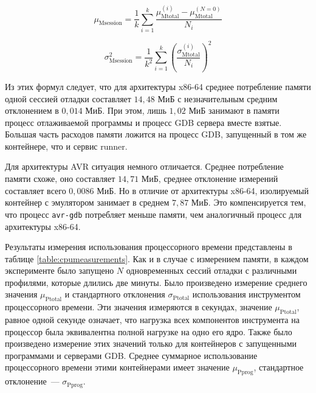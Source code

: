 \documentclass[a4paper,article,14pt]{extarticle}
\begin{document}
\begin{equation}
    \mu_\mathrm{Msession} = \frac1k \sum_{i=1}^k \frac{\mu_\mathrm{Mtotal}^{(i)} - \mu_\mathrm{Mtotal}^{(N = 0)}}{N_i}
    \label{eq:sessionmemorymean}
\end{equation}

\begin{equation}
    \sigma^2_\mathrm{Msession} = \frac{1}{k^2} \sum_{i=1}^k \left(\frac{\sigma_\mathrm{Mtotal}^{(i)}}{N_i}\right)^2
    \label{eq:sessionmemorystddev}
\end{equation}

Из этих формул следует, что для архитектуры x86-64 среднее потребление памяти одной сессией отладки составляет $14{,}48$ МиБ с незначительным средним отклонением в $0{,}014$ МиБ. При этом, лишь $1{,}02$ МиБ занимают в памяти процесс отлаживаемой программы и процесс GDB сервера вместе взятые. Большая часть расходов памяти ложится на процесс GDB, запущенный в том же контейнере, что и сервис runner.

Для архитектуры AVR ситуация немного отличается. Среднее потребление памяти схоже, оно составляет $14{,}71$ МиБ, среднее отклонение измерений составляет всего $0{,}0086$ МиБ. Но в отличие от архитектуры x86-64, изолируемый контейнер с эмулятором занимает в среднем $7{,}87$ МиБ. Это компенсируется тем, что процесс \texttt{avr-gdb} потребляет меньше памяти, чем аналогичный процесс для архитектуры x86-64.

Результаты измерения использования процессорного времени представлены в таблице \ref{table:cpumeasurements}. Как и в случае с измерением памяти, в каждом эксперименте было запущено $N$ одновременных сессий отладки с различными профилями, которые длились две минуты. Было произведено измерение среднего значения $\mu_\mathrm{Ptotal}$ и стандартного отклонения $\sigma_\mathrm{Ptotal}$ использования инструментом процессорного времени. Эти значения измеряются в секундах, значение $\mu_\mathrm{Ptotal}$, равное одной секунде означает, что нагрузка всех компонентов инструмента на процессор была эквивалентна полной нагрузке на одно его ядро. Также было произведено измерение этих значений только для контейнеров с запущенными программами и серверами GDB. Среднее суммарное использование процессорного времени этими контейнерами имеет значение $\mu_\mathrm{Pprog}$, стандартное отклонение~--- $\sigma_\mathrm{Pprog}$.
\end{document}
